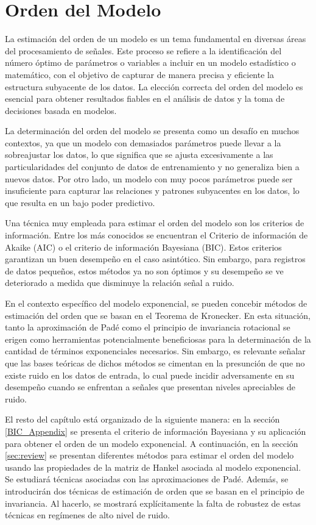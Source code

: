 \chapter{Orden del Modelo}\label{chap:OrdenModelo}


La estimación del orden de un modelo es un tema fundamental en diversas áreas del procesamiento de señales. Este proceso se refiere a la identificación del número óptimo de parámetros o variables a incluir en un modelo estadístico o matemático, con el objetivo de capturar de manera precisa y eficiente la estructura subyacente de los datos. La elección correcta del orden del modelo es esencial para obtener resultados fiables en el análisis de datos y la toma de decisiones basada en modelos.

La determinación del orden del modelo se presenta como un desafío en muchos contextos, ya que un modelo con demasiados parámetros puede llevar a la sobreajustar los datos, lo que significa que se ajusta excesivamente a las particularidades del conjunto de datos de entrenamiento y no generaliza bien a nuevos datos. Por otro lado, un modelo con muy pocos parámetros puede ser insuficiente para capturar las relaciones y patrones subyacentes en los datos, lo que resulta en un bajo poder predictivo.

Una técnica muy empleada para estimar el orden del modelo son los criterios de información. Entre los más conocidos se encuentran el Criterio de información de Akaike (AIC) o el criterio de información Bayesiana (BIC). Estos criterios garantizan un buen desempeño en el caso asintótico. Sin embargo, para registros de datos pequeños, estos métodos ya no son óptimos y su desempeño se ve deteriorado a medida que disminuye la relación señal a ruido. 

En el contexto específico del modelo exponencial, se pueden concebir métodos de estimación del orden que se basan en el Teorema de Kronecker. En esta situación, tanto la aproximación de Padé como el principio de invariancia rotacional se erigen como herramientas potencialmente beneficiosas para la determinación de la cantidad de términos exponenciales necesarios. Sin embargo, es relevante señalar que las bases teóricas de dichos métodos se cimentan en la presunción de que no existe ruido en los datos de entrada, lo cual puede incidir adversamente en su desempeño cuando se enfrentan a señales que presentan niveles apreciables de ruido.

El resto del capítulo está organizado de la siguiente manera: en la sección \ref{BIC_Appendix} se presenta el criterio  de información Bayesiana y su aplicación para obtener el orden de un modelo exponencial. A continuación, en la sección \ref{sec:review} se presentan diferentes métodos para estimar el orden del modelo usando las propiedades de la matriz de Hankel asociada al modelo exponencial. Se estudiará técnicas asociadas con las aproximaciones de Padé. Además, se introducirán dos técnicas de estimación de orden que se basan en el principio de invariancia. Al hacerlo, se mostrará explícitamente la falta de robustez de estas técnicas en regímenes de alto nivel de ruido. 


